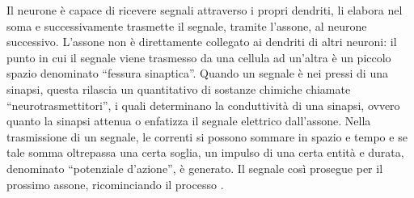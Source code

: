 Il neurone è capace di ricevere segnali attraverso i propri dendriti, li elabora 
nel soma e successivamente trasmette il segnale, tramite l’assone, al neurone 
successivo. L’assone non è direttamente collegato ai dendriti di altri neuroni: 
il punto in cui il segnale viene trasmesso da una cellula ad un’altra è un 
piccolo spazio denominato “fessura sinaptica”. Quando un segnale è nei 
pressi di una sinapsi, questa rilascia un quantitativo di sostanze chimiche
chiamate “neurotrasmettitori”, i quali determinano la conduttività di una 
sinapsi, ovvero quanto la sinapsi attenua o enfatizza il segnale elettrico 
dall’assone. Nella trasmissione di un segnale, le correnti si possono sommare 
in spazio e tempo e se tale somma oltrepassa una certa soglia, un impulso di 
una certa entità e durata, denominato “potenziale d’azione”, è generato. Il 
segnale così prosegue per il prossimo assone, ricominciando il 
processo \cite{NEURONE_BIOLOGICO}.
